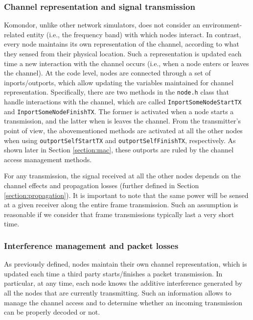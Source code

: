 \documentclass[a4paper]{article}
\begin{document}
	\subsubsection{Channel representation and signal transmission}	
	Komondor, unlike other network simulators, does not consider an environment-related entity (i.e., the frequency band) with which nodes interact. In contrast, every node maintains its own representation of the channel, according to what they sensed from their physical location. Such a representation is updated each time a new interaction with the channel occurs (i.e., when a node enters or leaves the channel). At the code level, nodes are connected through a set of inports/outports, which allow updating the variables maintained for channel representation. Specifically, there are two methods in the \texttt{node.h} class that handle interactions with the channel, which are called \texttt{InportSomeNodeStartTX} and \texttt{InportSomeNodeFinishTX}. The former is activated when a node starts a transmission, and the latter when is leaves the channel. From the transmitter's point of view, the abovementioned methods are activated at all the other nodes when using \texttt{outportSelfStartTX} and \texttt{outportSelfFinishTX}, respectively. As shown later in Section \ref{section:mac}, these outports are ruled by the channel access management methods.
	
	For any transmission, the signal received at all the other nodes depends on the channel effects and propagation losses (further defined in Section \ref{section:propagation}). It is important to note that the same power will be sensed at a given receiver along the entire frame transmission. Such an assumption is reasonable if we consider that frame transmissions typically last a very short time.
	
	\subsubsection{Interference management and packet losses}
	\label{section:interference}
	As previously defined, nodes maintain their own channel representation, which is updated each time a third party starts/finishes a packet transmission. In particular, at any time, each node knows the additive interference generated by all the nodes that are currently transmitting. Such an information allows to manage the channel access and to determine whether an incoming transmission can be properly decoded or not. 
	
\end{document}
